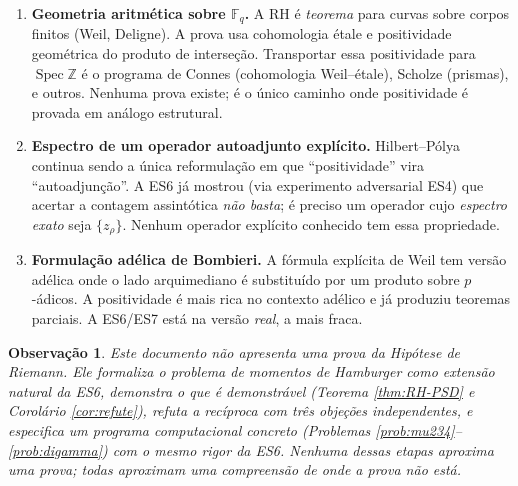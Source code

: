 \documentclass[12pt,a4paper]{article}
\newtheorem{observacao}{Observação}
\begin{document}
\begin{enumerate}[label=(\roman*)]
\item \textbf{Geometria aritmética sobre $\mathbb{F}_q$.} A RH é
\emph{teorema} para curvas sobre corpos finitos (Weil, Deligne). A
prova usa cohomologia étale e positividade geométrica do produto de
interseção. Transportar essa positividade para
$\operatorname{Spec}\mathbb{Z}$ é o programa de Connes (cohomologia
Weil--étale), Scholze (prismas), e outros. Nenhuma prova existe;
é o único caminho onde positividade é provada em análogo estrutural.
\item \textbf{Espectro de um operador autoadjunto explícito.}
Hilbert--Pólya continua sendo a única reformulação em que
``positividade'' vira ``autoadjunção''. A ES6 já mostrou (via
experimento adversarial ES4) que acertar a contagem assintótica
\emph{não basta}; é preciso um operador cujo \emph{espectro exato}
seja $\{z_\rho\}$. Nenhum operador explícito conhecido tem essa
propriedade.
\item \textbf{Formulação adélica de Bombieri.} A fórmula explícita de
Weil tem versão adélica onde o lado arquimediano é substituído por
um produto sobre $p$-ádicos. A positividade é mais rica no contexto
adélico e já produziu teoremas parciais. A ES6/ES7 está na versão
\emph{real}, a mais fraca.
\end{enumerate}

\begin{observacao}
Este documento não apresenta uma prova da Hipótese de Riemann. Ele
formaliza o problema de momentos de Hamburger como extensão natural
da ES6, demonstra o que é demonstrável (Teorema \ref{thm:RH-PSD} e
Corolário \ref{cor:refute}), refuta a recíproca com três objeções
independentes, e especifica um programa computacional concreto
(Problemas \ref{prob:mu234}--\ref{prob:digamma}) com o mesmo rigor
da ES6. Nenhuma dessas etapas aproxima uma prova; todas aproximam
uma \emph{compreensão} de onde a prova não está.
\end{observacao}
\end{document}
